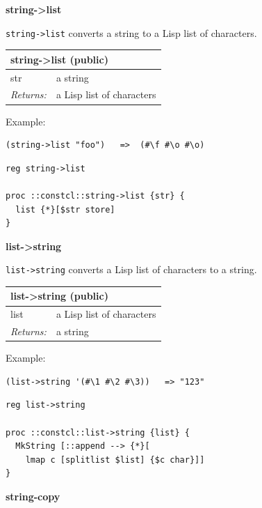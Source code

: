 \documentclass[twoside,9pt]{report}
\begin{document}
\textbf{string->list}


\texttt{string->list} converts a string to a Lisp list of characters.

\begin{tabular}{ |l l| }
\hline
\multicolumn{2}{|l|}{string->list (public)} \\
\hline
str & a string \\
\textit{Returns:} & a Lisp list of characters \\
\hline
\end{tabular}


Example:

\noindent\makebox[\linewidth]{\rule{\linewidth}{0.4pt}}
\begin{lstlisting}
(string->list "foo")   =>  (#\f #\o #\o)
\end{lstlisting}
\noindent\makebox[\linewidth]{\rule{\linewidth}{0.4pt}}
\noindent\makebox[\linewidth]{\rule{\linewidth}{0.4pt}}
\begin{lstlisting}
reg string->list
 
proc ::constcl::string->list {str} {
  list {*}[$str store]
}
\end{lstlisting}
\noindent\makebox[\linewidth]{\rule{\linewidth}{0.4pt}}

\textbf{list->string}


\texttt{list->string} converts a Lisp list of characters to a string.

\begin{tabular}{ |l l| }
\hline
\multicolumn{2}{|l|}{list->string (public)} \\
\hline
list & a Lisp list of characters \\
\textit{Returns:} & a string \\
\hline
\end{tabular}


Example:

\noindent\makebox[\linewidth]{\rule{\linewidth}{0.4pt}}
\begin{lstlisting}
(list->string '(#\1 #\2 #\3))   => "123"
\end{lstlisting}
\noindent\makebox[\linewidth]{\rule{\linewidth}{0.4pt}}
\noindent\makebox[\linewidth]{\rule{\linewidth}{0.4pt}}
\begin{lstlisting}
reg list->string
 
proc ::constcl::list->string {list} {
  MkString [::append --> {*}[
    lmap c [splitlist $list] {$c char}]]
}
\end{lstlisting}
\noindent\makebox[\linewidth]{\rule{\linewidth}{0.4pt}}

\textbf{string-copy}
\end{document}
